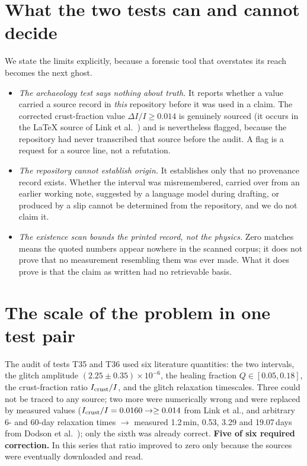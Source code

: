 \documentclass[11pt,a4paper]{article}
\begin{document}
\section{What the two tests can and cannot decide}
We state the limits explicitly, because a forensic tool that overstates its
reach becomes the next ghost.
\begin{itemize}
    \item \emph{The archaeology test says nothing about truth.} It reports
    whether a value carried a source record in \emph{this} repository
    before it was used in a claim. The corrected crust-fraction value
    $\Delta I/I \ge 0.014$ is genuinely sourced (it occurs in the LaTeX
    source of Link et al.~\cite{link1999}) and is nevertheless flagged,
    because the repository had never transcribed that source before the
    audit. A flag is a request for a source line, not a refutation.
    \item \emph{The repository cannot establish origin.} It establishes only
    that no provenance record exists. Whether the interval was misremembered,
    carried over from an earlier working note, suggested by a language model
    during drafting, or produced by a slip cannot be determined from the
    repository, and we do not claim it.
    \item \emph{The existence scan bounds the printed record, not the
    physics.} Zero matches means the quoted numbers appear nowhere in the
    scanned corpus; it does not prove that no measurement resembling them was
    ever made. What it does prove is that the claim as written had no
    retrievable basis.
\end{itemize}

\section{The scale of the problem in one test pair}
The audit of tests T35 and T36 used six literature quantities: the two
intervals, the glitch amplitude $(2.25\pm0.35)\times10^{-6}$, the healing
fraction $Q\in[0.05,0.18]$, the crust-fraction ratio $I_{\rm crust}/I$, and
the glitch relaxation timescales. Three could not be traced to any source;
two more were numerically wrong and were replaced by measured values
($I_{\rm crust}/I = 0.0160 \rightarrow \ge 0.014$ from Link et al., and
arbitrary 6- and 60-day relaxation times $\rightarrow$ measured 1.2\,min,
0.53, 3.29 and 19.07\,days from Dodson et al.~\cite{dodson2002}); only the
sixth was already correct. \textbf{Five of six required correction.} In this
series that ratio improved to zero only because the sources were eventually
downloaded and read.
\end{document}
